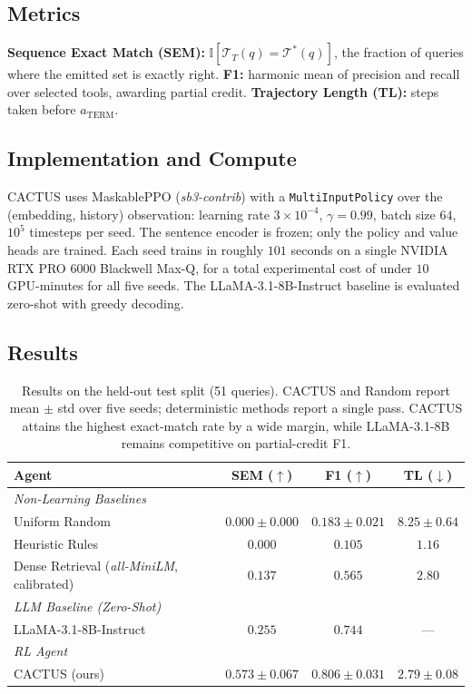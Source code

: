 \documentclass[11pt]{article}
\begin{document}
\subsection{Metrics}
\textbf{Sequence Exact Match (SEM):} $\mathbb{I}[\mathcal{T}_{T}(q) = \mathcal{T}^*(q)]$, the fraction of queries where the emitted set is exactly right.
\textbf{F1:} harmonic mean of precision and recall over selected tools, awarding partial credit.
\textbf{Trajectory Length (TL):} steps taken before $a_{\text{TERM}}$.

\subsection{Implementation and Compute}
CACTUS uses MaskablePPO (\textit{sb3-contrib}) with a \texttt{MultiInputPolicy} over the (embedding, history) observation: learning rate $3\times10^{-4}$, $\gamma = 0.99$, batch size $64$, $10^5$ timesteps per seed. The sentence encoder is frozen; only the policy and value heads are trained. Each seed trains in roughly $101$ seconds on a single NVIDIA RTX PRO 6000 Blackwell Max-Q, for a total experimental cost of under $10$ GPU-minutes for all five seeds. The LLaMA-3.1-8B-Instruct baseline is evaluated zero-shot with greedy decoding.

\subsection{Results}

\begin{table}[h]
\centering
\caption{Results on the held-out test split (51 queries). CACTUS and Random report mean $\pm$ std over five seeds; deterministic methods report a single pass. CACTUS attains the highest exact-match rate by a wide margin, while LLaMA-3.1-8B remains competitive on partial-credit F1.}
\label{tab:main_results}
\begin{tabular}{lccc}
\toprule
\textbf{Agent} & \textbf{SEM ($\uparrow$)} & \textbf{F1 ($\uparrow$)} & \textbf{TL ($\downarrow$)} \\
\midrule
\textit{Non-Learning Baselines} \\
Uniform Random & $0.000 \pm 0.000$ & $0.183 \pm 0.021$ & $8.25 \pm 0.64$ \\
Heuristic Rules & $0.000$ & $0.105$ & $1.16$ \\
Dense Retrieval (\textit{all-MiniLM}, calibrated) & $0.137$ & $0.565$ & $2.80$ \\
\midrule
\textit{LLM Baseline (Zero-Shot)} \\
LLaMA-3.1-8B-Instruct \cite{dubey2024llama3} & $0.255$ & $0.744$ & --- \\
\midrule
\textit{RL Agent} \\
CACTUS (ours) & $\mathbf{0.573 \pm 0.067}$ & $\mathbf{0.806 \pm 0.031}$ & $2.79 \pm 0.08$ \\
\bottomrule
\end{tabular}
\end{table}
\end{document}
